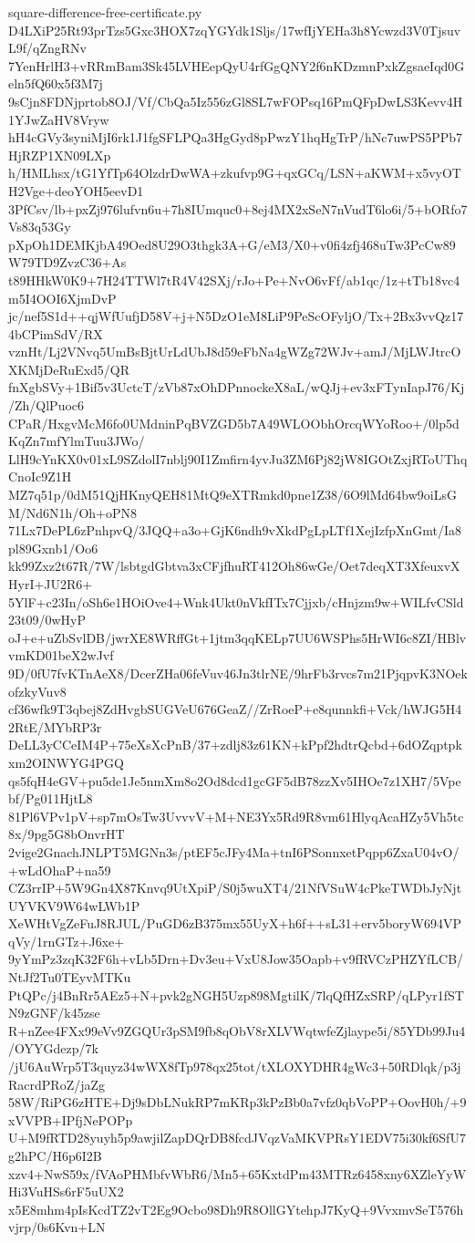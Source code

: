 \documentclass[11pt]{article}
\theoremstyle{definition}
\theoremstyle{remark}
\begin{document}
\begin{filecontents*}[overwrite]{square-difference-free-certificate.py}
D4LXiP25Rt93prTzs5Gxc3HOX7zqYGYdk1Sljs/17wfIjYEHa3h8Ycwzd3V0TjsuvL9f/qZngRNv
7YenHrlH3+vRRmBam3Sk45LVHEepQyU4rfGgQNY2f6nKDzmnPxkZgsaeIqd0Geln5fQ60x5f3M7j
9sCjn8FDNjprtob8OJ/Vf/CbQa5Iz556zGl8SL7wFOPsq16PmQFpDwLS3Kevv4H1YJwZaHV8Vryw
hH4cGVy3syniMjI6rk1J1fgSFLPQa3HgGyd8pPwzY1hqHgTrP/hNc7uwPS5PPb7HjRZP1XN09LXp
h/HMLhsx/tG1YfTp64OlzdrDwWA+zkufvp9G+qxGCq/LSN+aKWM+x5vyOTH2Vge+deoYOH5eevD1
3PfCsv/lb+pxZj976lufvn6u+7h8IUmquc0+8ej4MX2xSeN7nVudT6lo6i/5+bORfo7Vs83q53Gy
pXpOh1DEMKjbA49Oed8U29O3thgk3A+G/eM3/X0+v0fi4zfj468uTw3PcCw89W79TD9ZvzC36+As
t89HHkW0K9+7H24TTWl7tR4V42SXj/rJo+Pe+NvO6vFf/ab1qc/1z+tTb18vc4m5I4OOI6XjmDvP
jc/nef5S1d++qjWfUufjD58V+j+N5DzO1eM8LiP9PeScOFyljO/Tx+2Bx3vvQz174bCPimSdV/RX
vznHt/Lj2VNvq5UmBsBjtUrLdUbJ8d59eFbNa4gWZg72WJv+amJ/MjLWJtrcOXKMjDeRuExd5/QR
fnXgbSVy+1Bif5v3UctcT/zVb87xOhDPnnockeX8aL/wQJj+ev3xFTynIapJ76/Kj/Zh/QlPuoc6
CPaR/HxgvMcM6fo0UMdninPqBVZGD5b7A49WLOObhOrcqWYoRoo+/0lp5dKqZn7mfYlmTuu3JWo/
LlH9cYnKX0v01xL9SZdolI7nblj90I1Zmfirn4yvJu3ZM6Pj82jW8IGOtZxjRToUThqCnoIc9Z1H
MZ7q51p/0dM51QjHKnyQEH81MtQ9eXTRmkd0pne1Z38/6O9lMd64bw9oiLsGM/Nd6N1h/Oh+oPN8
71Lx7DePL6zPnhpvQ/3JQQ+a3o+GjK6ndh9vXkdPgLpLTf1XejIzfpXnGmt/Ia8pl89Gxnb1/Oo6
kk99Zxz2t67R/7W/lsbtgdGbtva3xCFjfhuRT412Oh86wGe/Oet7deqXT3XfeuxvXHyrI+JU2R6+
5YlF+c23In/oSh6e1HOiOve4+Wnk4Ukt0nVkfITx7Cjjxb/cHnjzm9w+WILfvCSld23t09/0wHyP
oJ+e+uZbSvlDB/jwrXE8WRffGt+1jtm3qqKELp7UU6WSPhs5HrWI6c8ZI/HBlvvmKD01beX2wJvf
9D/0fU7fvKTnAeX8/DcerZHa06feVuv46Jn3tlrNE/9hrFb3rvcs7m21PjqpvK3NOekofzkyVuv8
cf36wfk9T3qbej8ZdHvgbSUGVeU676GeaZ//ZrRoeP+e8qunnkfi+Vck/hWJG5H42RtE/MYbRP3r
DeLL3yCCeIM4P+75eXsXcPnB/37+zdlj83z61KN+kPpf2hdtrQcbd+6dOZqptpkxm2OINWYG4PGQ
qs5fqH4eGV+pu5de1Je5nmXm8o2Od8dcd1gcGF5dB78zzXv5IHOe7z1XH7/5Vpebf/Pg011HjtL8
81Pl6VPv1pV+sp7mOsTw3UvvvV+M+NE3Yx5Rd9R8vm61HlyqAcaHZy5Vh5tc8x/9pg5G8bOnvrHT
2vige2GnachJNLPT5MGNn3s/ptEF5cJFy4Ma+tnI6PSonnxetPqpp6ZxaU04vO/+wLdOhaP+na59
CZ3rrIP+5W9Gn4X87Knvq9UtXpiP/S0j5wuXT4/21NfVSuW4cPkeTWDbJyNjtUYVKV9W64wLWb1P
XeWHtVgZeFuJ8RJUL/PuGD6zB375mx55UyX+h6f++sL31+erv5boryW694VPqVy/1rnGTz+J6xe+
9yYmPz3zqK32F6h+vLb5Drn+Dv3eu+VxU8Jow35Oapb+v9fRVCzPHZYfLCB/NtJf2Tu0TEyvMTKu
PtQPc/j4BnRr5AEz5+N+pvk2gNGH5Uzp898MgtilK/7lqQfHZxSRP/qLPyr1fSTN9zGNF/k45zse
R+nZee4FXx99eVv9ZGQUr3pSM9fb8qObV8rXLVWqtwfeZjlaype5i/85YDb99Ju4/OYYGdezp/7k
/jU6AuWrp5T3quyz34wWX8fTp978qx25tot/tXLOXYDHR4gWc3+50RDlqk/p3jRacrdPRoZ/jaZg
58W/RiPG6zHTE+Dj9sDbLNukRP7mKRp3kPzBb0a7vfz0qbVoPP+OovH0h/+9xVVPB+IPfjNePOPp
U+M9fRTD28yuyh5p9awjilZapDQrDB8fcdJVqzVaMKVPRsY1EDV75i30kf6SfU7g2hPC/H6p6I2B
xzv4+NwS59x/fVAoPHMbfvWbR6/Mn5+65KxtdPm43MTRz6458xny6XZleYyWHi3VuHSs6rF5uUX2
x5E8mhm4pIsKcdTZ2vT2Eg9Ocbo98Dh9R8OllGYtehpJ7KyQ+9VvxmvSeT576hvjrp/0s6Kvn+LN

\end{filecontents*}
\end{document}
